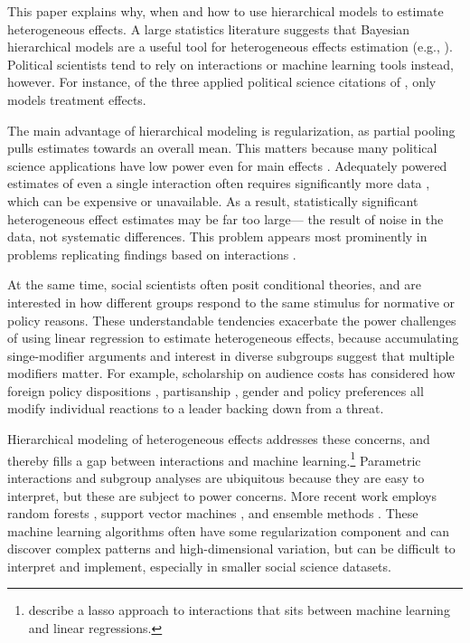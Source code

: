 \documentclass[12pt]{article}
\begin{document}
This paper explains why, when and how to use hierarchical models to estimate heterogeneous effects. 
A large statistics literature suggests that Bayesian hierarchical models are a useful tool for  heterogeneous effects estimation (e.g., \cite{FellerGelman2015, McElreath2016, Dorieetal2022}).
Political scientists tend to rely on interactions or machine learning tools instead, however.  
For instance, of the three applied political science citations of \citet{FellerGelman2015}, only \citet{Marquardt2022} models treatment effects. 


The main advantage of hierarchical modeling is regularization, as partial pooling pulls estimates towards an overall mean. 
This matters because many political science applications have low power even for main effects \citep{ArelBundocketal2022}.
Adequately powered estimates of even a single interaction often requires significantly more data \citep{Gelman2018}, which can be expensive or unavailable.
As a result, statistically significant heterogeneous effect estimates may be far too large--- the result of noise in the data, not systematic differences. 
This problem appears most prominently in problems replicating findings based on interactions \citep{Simmonsetal2011}. 


At the same time, social scientists often posit conditional theories, and are interested in how different groups respond to the same stimulus for normative or policy reasons.
These understandable tendencies exacerbate the power challenges of using linear regression to estimate heterogeneous effects, because accumulating singe-modifier arguments and interest in diverse subgroups suggest that multiple modifiers matter.  
For example, scholarship on audience costs has considered how foreign policy dispositions \citep{KertzerBrutger2016}, partisanship \citep{LevenduskyHorowitz2012}, gender \citep{Barnhartetal2020, SchwartzBlair2020} and policy preferences \citep{Chaudoin2014} all modify individual reactions to a leader backing down from a threat.


Hierarchical modeling of heterogeneous effects addresses these concerns, and thereby fills a gap between interactions and machine learning.\footnote{\citet{BlackwellOlson2022} describe a lasso approach to interactions that sits between machine learning and linear regressions.}
Parametric interactions and subgroup analyses are ubiquitous because they are easy to interpret, but these are subject to power concerns. 
More recent work employs random forests \citep{GreenKern2012, WagerAthey2018}, support vector machines \citep{ImaiRatkovic2013}, and ensemble methods \citep{Grimmeretal2017, Kuenzeletal2019, Dorieetal2022}.
These machine learning algorithms often have some regularization component and can discover complex patterns and high-dimensional variation, but can be difficult to interpret and implement, especially in smaller social science datasets.
\end{document}
